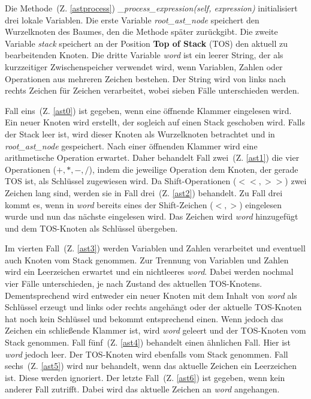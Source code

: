 Die Methode~(Z. \ref{astprocess}) \textit{\_process\_expression(self, expression)} initialisiert drei lokale Variablen.
Die erste Variable \textit{root\_ast\_node} speichert den Wurzelknoten des Baumes, den die Methode später zurückgibt. Die zweite Variable \textit{stack} speichert an der 
Position \textbf{Top of Stack} (TOS) den aktuell zu bearbeitenden Knoten. Die dritte Variable \textit{word} ist ein leerer String, der als kurzzeitiger Zwischenspeicher verwendet wird,
wenn Variablen, Zahlen oder Operationen aus mehreren Zeichen bestehen.
Der String wird von links nach rechts Zeichen für Zeichen verarbeitet, wobei sieben Fälle unterschieden werden.

Fall eins~(Z. \ref{ast0}) ist gegeben, wenn eine öffnende Klammer eingelesen wird. Ein neuer Knoten wird erstellt, der sogleich auf einen Stack geschoben wird. Falls der Stack leer ist, wird
dieser Knoten als Wurzelknoten betrachtet und in \textit{root\_ast\_node} gespeichert.
Nach einer öffnenden Klammer wird eine arithmetische Operation erwartet. 
Daher behandelt Fall zwei~(Z. \ref{ast1}) die vier Operationen ($+, *, -, /$), indem die jeweilige Operation dem Knoten, der gerade TOS ist,
als Schlüssel zugewiesen wird. Da Shift-Operationen ($<<, >>$) zwei Zeichen lang sind, werden sie in Fall drei~(Z. \ref{ast2}) behandelt.
Zu Fall drei kommt es, wenn in \textit{word} bereits eines der Shift-Zeichen ($<, >$) eingelesen wurde und nun das nächste eingelesen wird.
Das Zeichen wird \textit{word} hinzugefügt und dem TOS-Knoten als Schlüssel übergeben.

Im vierten Fall~(Z. \ref{ast3}) werden Variablen und Zahlen verarbeitet und eventuell auch Knoten vom Stack genommen.
Zur Trennung von Variablen und Zahlen wird ein Leerzeichen erwartet und ein nichtleeres \textit{word}.
Dabei werden nochmal vier Fälle unterschieden, je nach Zustand des aktuellen TOS-Knotens. Dementsprechend wird entweder ein neuer Knoten mit dem Inhalt von \textit{word} als Schlüssel
erzeugt und links oder rechts angehängt oder der aktuelle TOS-Knoten hat noch kein Schlüssel und bekommt entsprechend einen. 
Wenn jedoch das Zeichen ein schließende Klammer ist, wird \textit{word} geleert und der TOS-Knoten vom Stack genommen.
Fall fünf~(Z. \ref{ast4}) behandelt einen ähnlichen Fall. Hier ist \textit{word} jedoch leer. Der TOS-Knoten wird ebenfalls vom Stack genommen.
Fall sechs~(Z. \ref{ast5}) wird nur behandelt, wenn das aktuelle Zeichen ein Leerzeichen ist. Diese werden ignoriert.
Der letzte Fall~(Z. \ref{ast6}) ist gegeben, wenn kein anderer Fall zutrifft. Dabei wird das aktuelle Zeichen an \textit{word} angehangen.

